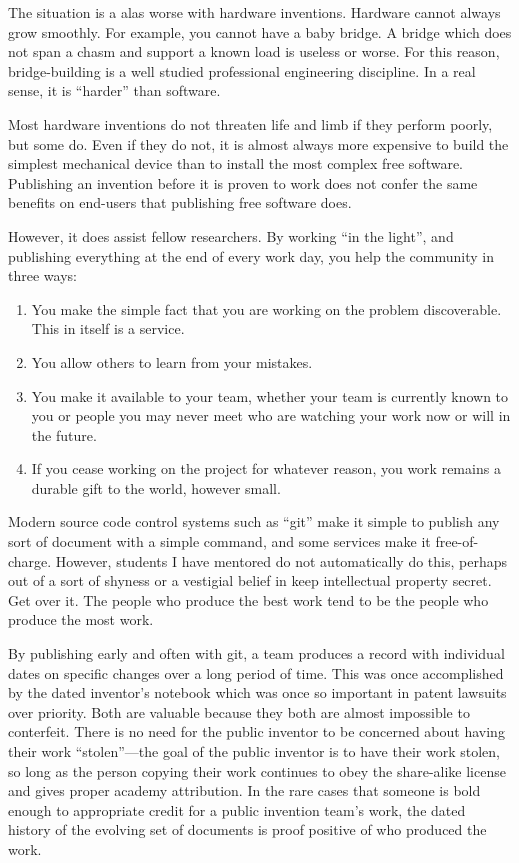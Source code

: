 \documentclass[
	fontsize=10pt, %
	twoside=false, %
	secnumdepth=1, %
]{kaobook}
\begin{document}
The situation is a alas worse with hardware inventions. Hardware cannot
always grow smoothly. For example, you cannot have a baby bridge.
A bridge which does not span a chasm and support a known load is useless
or worse.
For this reason, bridge-building is a well studied professional engineering discipline.
In a real sense, it is ``harder'' than software.

Most hardware inventions do not threaten life and limb if they perform poorly,
but some do.
Even if they do not, it is almost always more expensive to build the simplest
mechanical device than to install the most complex free software.
Publishing an invention before it is proven to work does not confer
the same benefits on end-users that publishing free software does.

However, it does assist fellow researchers. By working ``in the light'',
and publishing everything at the end of every work day, you help the
community in three ways:
\begin{enumerate}
\item You make the simple fact that you are working on the problem discoverable.
  This in itself is a service.
\item You allow others to learn from your mistakes.
\item You make it available to your team, whether your team is currently known to you or
  people you may never meet who are watching your work now or will in the future.
\item If you cease working on the project for whatever reason, you work remains
  a durable gift to the world, however small.
\end{enumerate}

Modern source code control systems such as ``git'' make it simple to publish any sort
of document with a simple command, and some services make it free-of-charge.
However, students I have mentored do not automatically do this, perhaps out of a sort of shyness or
a vestigial belief in keep intellectual property secret. Get over it.
The people who produce the best work tend to be the people who produce the most work.

By publishing early and often with git, a team produces a record with individual dates on specific changes over a long period
of time.
This was once accomplished by the dated inventor's notebook which was once so important in patent lawsuits over priority.
Both are valuable because they both are almost impossible to conterfeit.
There is no need for the public inventor to be concerned about having their work ``stolen''---the goal of the public inventor
is to have their work stolen, so long as the person copying their work continues to obey the share-alike license and gives
proper academy attribution.
In the rare cases that someone is bold enough to appropriate credit for a public invention team's work, the
dated history of the evolving set of documents is proof positive of who produced the work.
\end{document}
